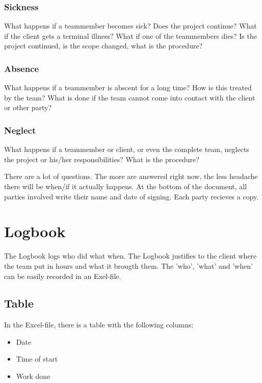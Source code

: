 \documentclass[10pt]{report}
\begin{document}
\subsubsection{Sickness}

What happens if a teammember becomes sick? Does the project continue? What if the client gets a terminal illness? What if one of the teammembers dies? Is the project continued, is the scope changed, what is the procedure?

\subsubsection{Absence}

What happens if a teammember is abscent for a long time? How is this treated by the team? What is done if the team cannot come into contact with the client or other party?

\subsubsection{Neglect}

What happens if a teammember or client, or even the complete team, neglects the project or his/her responsibilities? What is the procedure?

\bigskip

There are a lot of questions. The more are answered right now, the less headache there will be when/if it actually happens. At the bottom of the document, all parties involved write their name and date of signing. Each party recieves a copy.

\newpage

\section{Logbook}

The Logbook logs who did what when. The Logbook justifies to the client where the team put in hours and what it brougth them. The 'who', 'what' and 'when' can be easily recorded in an Exel-file.

\subsection{Table}

In the Excel-file, there is a table with the following columns:

\begin{itemize}
	\item Date
	\item Time of start
	\item Work done
\end{itemize}
\end{document}
